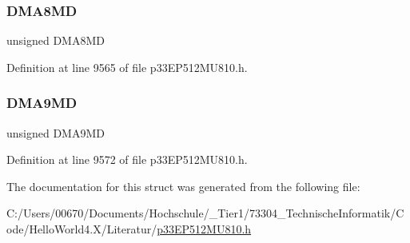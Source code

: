 \subsubsection{\texorpdfstring{D\+M\+A8\+MD}{DMA8MD}}
{\footnotesize\ttfamily unsigned D\+M\+A8\+MD}



Definition at line 9565 of file p33\+E\+P512\+M\+U810.\+h.

\mbox{\label{structtag_p_m_d7_b_i_t_s_a76cf5463275a214ba2a90277f191213f}} 
\subsubsection{\texorpdfstring{D\+M\+A9\+MD}{DMA9MD}}
{\footnotesize\ttfamily unsigned D\+M\+A9\+MD}



Definition at line 9572 of file p33\+E\+P512\+M\+U810.\+h.



The documentation for this struct was generated from the following file\+:\begin{DoxyCompactItemize}
\item 
C\+:/\+Users/00670/\+Documents/\+Hochschule/\+\_\+\+Tier1/73304\+\_\+\+Technische\+Informatik/\+Code/\+Hello\+World4.\+X/\+Literatur/\hyperlink{p33_e_p512_m_u810_8h}{p33\+E\+P512\+M\+U810.\+h}\end{DoxyCompactItemize}
